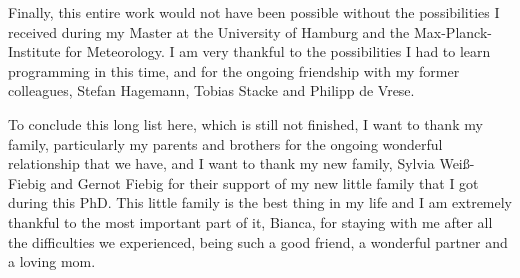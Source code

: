 \begin{acknowledgements}
 Finally, this entire work would not have been possible without the possibilities I received during my Master at the University of Hamburg and the Max-Planck-Institute for Meteorology. I am very thankful to the possibilities I had to learn programming in this time, and for the ongoing friendship with my former colleagues, Stefan Hagemann, Tobias Stacke and Philipp de Vrese. 
 
 To conclude this long list here, which is still not finished, I want to thank my family, particularly my parents and brothers for the ongoing wonderful relationship that we have, and I want to thank my new family, Sylvia Weiß-Fiebig and Gernot Fiebig for their support of my new little family that I got during this PhD. This little family is the best thing in my life and I am extremely thankful to the most important part of it, Bianca, for staying with me after all the difficulties we experienced, being such a good friend, a wonderful partner and a loving mom.
\end{acknowledgements}


